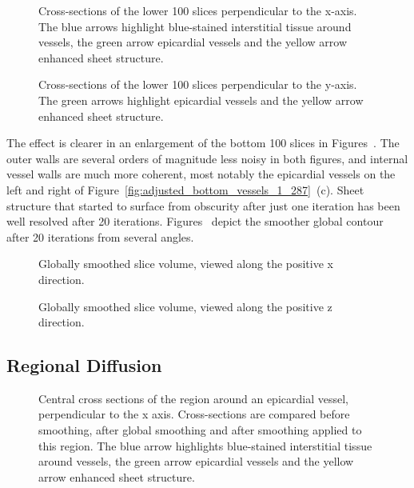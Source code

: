     \begin{figure}[htbp]
      \caption{Cross-sections of the lower 100 slices perpendicular to the x-axis. The blue arrows highlight blue-stained interstitial tissue around vessels, the green arrow epicardial vessels and the yellow arrow enhanced sheet structure.}
    \end{figure}

    \begin{figure}[htbp]
      \caption{Cross-sections of the lower 100 slices perpendicular to the y-axis. The green arrows highlight epicardial vessels and the yellow arrow enhanced sheet structure.}
    \end{figure}
    
    The effect is clearer in an enlargement of the bottom 100 slices in Figures~. The outer walls are several orders of magnitude less noisy in both figures, and internal vessel walls are much more coherent, most notably the epicardial vessels on the left and right of Figure~\ref{fig:adjusted_bottom_vessels_1_287}~(c). Sheet structure that started to surface from obscurity after just one iteration has been well resolved after 20 iterations. Figures~ depict the smoother global contour after 20 iterations from several angles.
    
    \begin{figure}[p]
      \caption{Globally smoothed slice volume, viewed along the positive x direction.}
    \end{figure}

    \begin{figure}[p]
      \caption{Globally smoothed slice volume, viewed along the positive z direction.}
    \end{figure}
  
  
  \subsection{Regional Diffusion} %
  \label{sub:regional_diffusion}
      \begin{figure}[p]
        \caption{Central cross sections of the region around an epicardial vessel, perpendicular to the x axis. Cross-sections are compared before smoothing, after global smoothing and after smoothing applied to this region. The blue arrow highlights blue-stained interstitial tissue around vessels, the green arrow epicardial vessels and the yellow arrow enhanced sheet structure.}
      \end{figure}
    
